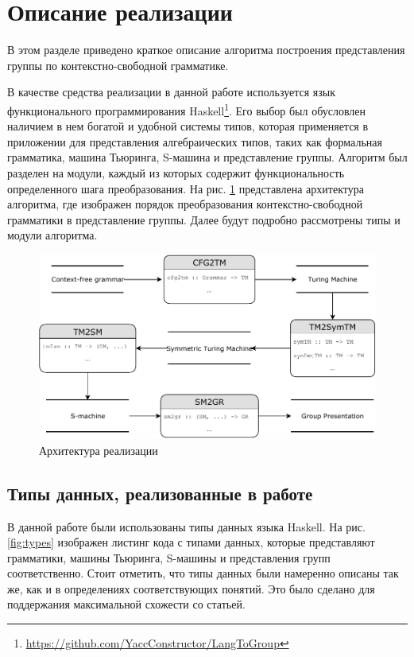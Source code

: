 \documentclass[14pt]{matmex-diploma-custom}
\begin{document}
\section{Описание реализации}

В этом разделе приведено краткое описание алгоритма построения представления
группы по контекстно-свободной грамматике. 

В качестве средства реализации в данной работе используется язык функционального 
программирования Haskell\footnote{\url{https://github.com/YaccConstructor/LangToGroup}}.
Его выбор был обусловлен наличием в нем богатой и удобной системы типов,
которая применяется в приложении для представления алгебраических типов, таких как формальная грамматика,
машина Тьюринга, S-машина и представление группы. 
Алгоритм был разделен на модули, каждый из которых
содержит функциональность определенного шага преобразования. 
На рис. \ref{fig:arch} представлена архитектура алгоритма,
где изображен порядок преобразования контекстно-свободной грамматики 
в представление группы. Далее будут подробно рассмотрены типы и модули алгоритма.

\begin{figure}[H]
\centering
  \includegraphics[width=\linewidth]{pics/diplomaSmallUML.pdf}
  \caption{Архитектура реализации}
  \label{fig:arch}
\end{figure}

\subsection{Типы данных, реализованные в работе}
В данной работе были использованы типы данных языка Haskell. На рис. \ref{fig:types} изображен листинг кода с типами данных, которые представляют грамматики, машины Тьюринга, S-машины и представления групп соответственно. Стоит отметить, что типы данных были намеренно описаны так же, как и в определениях соответствующих понятий. Это было сделано для поддержания максимальной схожести со статьей. 
\end{document}

